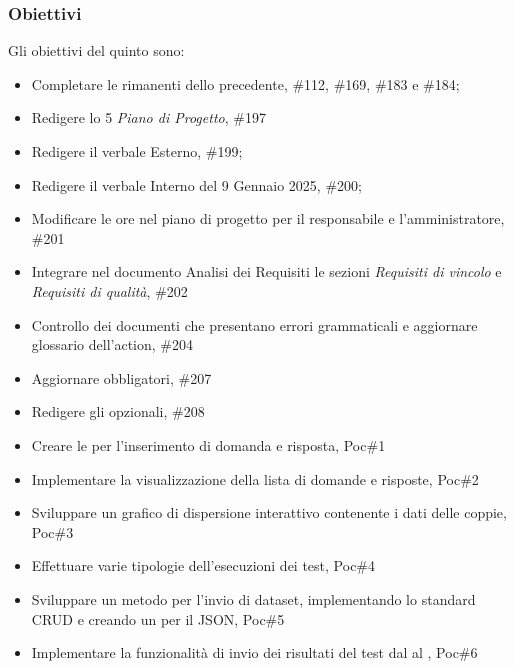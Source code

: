 \subsubsection{Obiettivi}
Gli obiettivi del quinto  sono:
\begin{itemize}
    \item Completare le  rimanenti dello  precedente,  \#112, \#169, \#183 e \#184;
    \item Redigere lo  5 \textit{Piano di Progetto},  \#197
    \item Redigere il verbale Esterno,  \#199;
    \item Redigere il verbale Interno del 9 Gennaio 2025,  \#200;
    \item Modificare le ore nel piano di progetto per il responsabile e l’amministratore,  \#201
    \item Integrare nel documento Analisi dei Requisiti le sezioni \textit{Requisiti di vincolo} e \textit{Requisiti di qualità},  \#202
    \item Controllo dei documenti che presentano errori grammaticali e aggiornare glossario dell'action,  \#204
    \item Aggiornare  obbligatori,  \#207
    \item Redigere gli  opzionali,  \#208
    \item Creare le  per l'inserimento di domanda e risposta,  Poc\#1
    \item Implementare la visualizzazione della lista di domande e risposte,  Poc\#2
    \item Sviluppare un grafico di dispersione interattivo contenente i dati delle coppie,  Poc\#3
    \item Effettuare varie tipologie dell'esecuzioni dei test,  Poc\#4
    \item Sviluppare un metodo per l’invio di dataset, implementando lo standard CRUD e creando un  per il JSON,  Poc\#5
    \item Implementare la funzionalità di invio dei risultati del test dal  al ,  Poc\#6
\end{itemize}